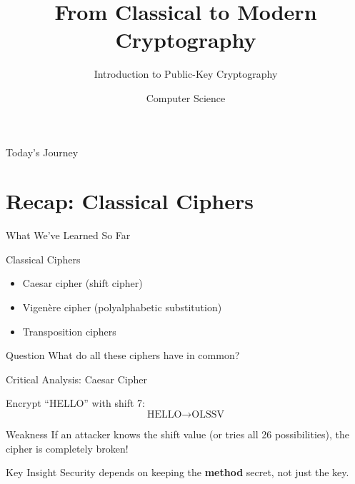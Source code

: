 \documentclass{beamer}
\title{From Classical to Modern Cryptography}
\subtitle{Introduction to Public-Key Cryptography}
\author{Computer Science}
\date{}
\begin{document}
\frame{\titlepage}

\begin{frame}{Today's Journey}
\tableofcontents
\end{frame}

\section{Recap: Classical Ciphers}

\begin{frame}{What We've Learned So Far}
\begin{block}{Classical Ciphers}
\begin{itemize}
    \item Caesar cipher (shift cipher)
    \item Vigenère cipher (polyalphabetic substitution)
    \item Transposition ciphers
\end{itemize}
\end{block}

\pause

\begin{alertblock}{Question}
What do all these ciphers have in common?
\end{alertblock}
\end{frame}

\begin{frame}{Critical Analysis: Caesar Cipher}
\begin{example}
Encrypt ``HELLO'' with shift 7:
\[
\text{HELLO} \rightarrow \text{OLSSV}
\]
\end{example}

\pause

\begin{alertblock}{Weakness}
If an attacker knows the shift value (or tries all 26 possibilities), the cipher is completely broken!
\end{alertblock}

\pause

\begin{block}{Key Insight}
Security depends on keeping the \textbf{method} secret, not just the key.
\end{block}
\end{frame}
\end{document}
